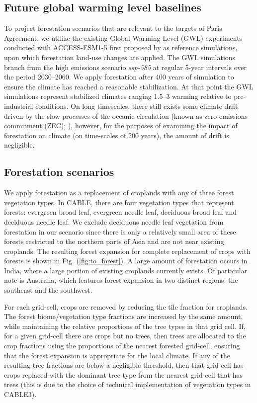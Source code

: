 \documentclass[]{article}
\begin{document}
\subsection{Future global warming level baselines}

To project forestation scenarios that are relevant to the targets of Paris Agreement, we utilize the existing Global Warming Level (GWL) experiments conducted with ACCESS-ESM1-5 first proposed by \cite{king_studying_2021} as reference simulations, upon which forestation land-use changes are applied.
The GWL simulations branch from the high emissions scenario \textit{ssp-585} \parencite{oneill_scenario_2016, jones_c4mip_2016} at regular 5-year intervals over the period 2030--2060.
We apply forestation after 400 years of simulation to ensure the climate has reached a reasonable stabilization.
At that point the GWL simulations represent stabilized climates ranging 1.5--3 \textcelsius  warming relative to pre-industrial conditions.
On long timescales, there still exists some climate drift driven by the slow processes of the oceanic circulation (known as zero-emissions commitment (ZEC); \cite{chamberlain_southern_2023}), however, for the purposes of examining the impact of forestation on climate (on time-scales of 200 years), the amount of drift is negligible.

\subsection{Forestation scenarios}

We apply forestation as a replacement of croplands with any of three forest vegetation types.
In CABLE, there are four vegetation types that represent forests: evergreen broad leaf, evergreen needle leaf, deciduous broad leaf and deciduous needle leaf.
We exclude deciduous needle leaf vegetation from forestation in our scenario since there is only a relatively small area of these forests restricted to the northern parts of Asia and are not near existing croplands.
The resulting forest expansion for complete replacement of crops with forests is shown in Fig. (\ref{fig:to_forest}).
A large amount of forestation occurs in India, where a large portion of existing croplands currently exists.
Of particular note is Australia, which features forest expansion in two distinct regions: the southeast and the southwest.

For each grid-cell, crops are removed by reducing the tile fraction for croplands.
The forest biome/vegetation type fractions are increased by the same amount, while maintaining the relative proportions of the tree types in that grid cell.
If, for a given grid-cell there are crops but no trees, then trees are allocated to the crop fractions using the proportions of the nearest forested grid-cell, ensuring that the forest expansion is appropriate for the local climate.
If any of the resulting tree fractions are below a negligible threshold, then that grid-cell has crops replaced with the dominant tree type from the nearest grid-cell that has trees (this is due to the choice of technical implementation of vegetation types in CABLE3).
\end{document}

